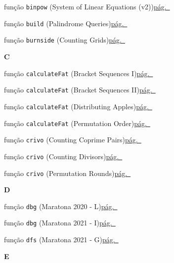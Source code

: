 \documentclass[10pt, a4paper, twocolumn, landscape]{article}
\begin{document}
{\noindent função \texttt{binpow} {\scriptsize\color{codegray}(System of Linear Equations (v2))}\dotfill\hyperref[fn67]{pág.~\pageref*{fn67}}\par
\noindent função \texttt{build} {\scriptsize\color{codegray}(Palindrome Queries)}\dotfill\hyperref[fn55]{pág.~\pageref*{fn55}}\par
\noindent função \texttt{burnside} {\scriptsize\color{codegray}(Counting Grids)}\dotfill\hyperref[fn52]{pág.~\pageref*{fn52}}\par
\par\medskip\textbf{\large C}\par
\noindent função \texttt{calculateFat} {\scriptsize\color{codegray}(Bracket Sequences I)}\dotfill\hyperref[fn43]{pág.~\pageref*{fn43}}\par
\noindent função \texttt{calculateFat} {\scriptsize\color{codegray}(Bracket Sequences II)}\dotfill\hyperref[fn48]{pág.~\pageref*{fn48}}\par
\noindent função \texttt{calculateFat} {\scriptsize\color{codegray}(Distributing Apples)}\dotfill\hyperref[fn21]{pág.~\pageref*{fn21}}\par
\noindent função \texttt{calculateFat} {\scriptsize\color{codegray}(Permutation Order)}\dotfill\hyperref[fn75]{pág.~\pageref*{fn75}}\par
\noindent função \texttt{crivo} {\scriptsize\color{codegray}(Counting Coprime Pairs)}\dotfill\hyperref[fn53]{pág.~\pageref*{fn53}}\par
\noindent função \texttt{crivo} {\scriptsize\color{codegray}(Counting Divisors)}\dotfill\hyperref[fn18]{pág.~\pageref*{fn18}}\par
\noindent função \texttt{crivo} {\scriptsize\color{codegray}(Permutation Rounds)}\dotfill\hyperref[fn78]{pág.~\pageref*{fn78}}\par
\par\medskip\textbf{\large D}\par
\noindent função \texttt{dbg} {\scriptsize\color{codegray}(Maratona 2020 - L)}\dotfill\hyperref[fn88]{pág.~\pageref*{fn88}}\par
\noindent função \texttt{dbg} {\scriptsize\color{codegray}(Maratona 2021 - I)}\dotfill\hyperref[fn89]{pág.~\pageref*{fn89}}\par
\noindent função \texttt{dfs} {\scriptsize\color{codegray}(Maratona 2021 - G)}\dotfill\hyperref[fn36]{pág.~\pageref*{fn36}}\par
\par\medskip\textbf{\large E}\par
}
\end{document}
